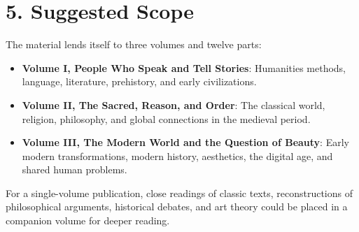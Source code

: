 \section*{5. Suggested Scope}
The material lends itself to three volumes and twelve parts:

\begin{itemize}
\item \textbf{Volume I, People Who Speak and Tell Stories}: Humanities methods, language, literature, prehistory, and early civilizations.
\item \textbf{Volume II, The Sacred, Reason, and Order}: The classical world, religion, philosophy, and global connections in the medieval period.
\item \textbf{Volume III, The Modern World and the Question of Beauty}: Early modern transformations, modern history, aesthetics, the digital age, and shared human problems.
\end{itemize}
For a single-volume publication, close readings of classic texts, reconstructions of philosophical arguments, historical debates, and art theory could be placed in a companion volume for deeper reading.
